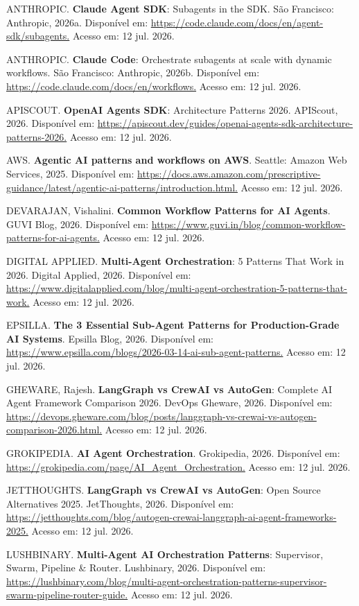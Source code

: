 \documentclass[12pt,a4paper]{article}
\begin{document}
ANTHROPIC. \textbf{Claude Agent SDK}: Subagents in the SDK. São Francisco: Anthropic, 2026a. Disponível em: \url{https://code.claude.com/docs/en/agent-sdk/subagents.} Acesso em: 12 jul. 2026.

ANTHROPIC. \textbf{Claude Code}: Orchestrate subagents at scale with dynamic workflows. São Francisco: Anthropic, 2026b. Disponível em: \url{https://code.claude.com/docs/en/workflows.} Acesso em: 12 jul. 2026.

APISCOUT. \textbf{OpenAI Agents SDK}: Architecture Patterns 2026. APIScout, 2026. Disponível em: \url{https://apiscout.dev/guides/openai-agents-sdk-architecture-patterns-2026.} Acesso em: 12 jul. 2026.

AWS. \textbf{Agentic AI patterns and workflows on AWS}. Seattle: Amazon Web Services, 2025. Disponível em: \url{https://docs.aws.amazon.com/prescriptive-guidance/latest/agentic-ai-patterns/introduction.html.} Acesso em: 12 jul. 2026.

DEVARAJAN, Vishalini. \textbf{Common Workflow Patterns for AI Agents}. GUVI Blog, 2026. Disponível em: \url{https://www.guvi.in/blog/common-workflow-patterns-for-ai-agents.} Acesso em: 12 jul. 2026.

DIGITAL APPLIED. \textbf{Multi-Agent Orchestration}: 5 Patterns That Work in 2026. Digital Applied, 2026. Disponível em: \url{https://www.digitalapplied.com/blog/multi-agent-orchestration-5-patterns-that-work.} Acesso em: 12 jul. 2026.

EPSILLA. \textbf{The 3 Essential Sub-Agent Patterns for Production-Grade AI Systems}. Epsilla Blog, 2026. Disponível em: \url{https://www.epsilla.com/blogs/2026-03-14-ai-sub-agent-patterns.} Acesso em: 12 jul. 2026.

GHEWARE, Rajesh. \textbf{LangGraph vs CrewAI vs AutoGen}: Complete AI Agent Framework Comparison 2026. DevOps Gheware, 2026. Disponível em: \url{https://devops.gheware.com/blog/posts/langgraph-vs-crewai-vs-autogen-comparison-2026.html.} Acesso em: 12 jul. 2026.

GROKIPEDIA. \textbf{AI Agent Orchestration}. Grokipedia, 2026. Disponível em: \url{https://grokipedia.com/page/AI\_Agent\_Orchestration.} Acesso em: 12 jul. 2026.

JETTHOUGHTS. \textbf{LangGraph vs CrewAI vs AutoGen}: Open Source Alternatives 2025. JetThoughts, 2026. Disponível em: \url{https://jetthoughts.com/blog/autogen-crewai-langgraph-ai-agent-frameworks-2025.} Acesso em: 12 jul. 2026.

LUSHBINARY. \textbf{Multi-Agent AI Orchestration Patterns}: Supervisor, Swarm, Pipeline \& Router. Lushbinary, 2026. Disponível em: \url{https://lushbinary.com/blog/multi-agent-orchestration-patterns-supervisor-swarm-pipeline-router-guide.} Acesso em: 12 jul. 2026.
\end{document}
